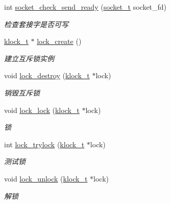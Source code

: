 \begin{DoxyCompactItemize}
int \hyperlink{a00100_a8afd26cc26824e35f1ec942d2c367c2b_a8afd26cc26824e35f1ec942d2c367c2b}{socket\+\_\+check\+\_\+send\+\_\+ready} (\hyperlink{a00066_a0d9e0afbf02fb6ed6c5b1415dce51b05_a0d9e0afbf02fb6ed6c5b1415dce51b05}{socket\+\_\+t} socket\+\_\+fd)
\begin{DoxyCompactList}\small\item\em 检查套接字是否可写 \end{DoxyCompactList}\item 
\hyperlink{a00066_a4c2f62ab63ab1fd49c71e52bbda0f393_a4c2f62ab63ab1fd49c71e52bbda0f393}{klock\+\_\+t} $\ast$ \hyperlink{a00100_a7860cb0060346d30b45ea9cb824c2be0_a7860cb0060346d30b45ea9cb824c2be0}{lock\+\_\+create} ()
\begin{DoxyCompactList}\small\item\em 建立互斥锁实例 \end{DoxyCompactList}\item 
void \hyperlink{a00100_aee8678800992b6012933740a9d7528af_aee8678800992b6012933740a9d7528af}{lock\+\_\+destroy} (\hyperlink{a00066_a4c2f62ab63ab1fd49c71e52bbda0f393_a4c2f62ab63ab1fd49c71e52bbda0f393}{klock\+\_\+t} $\ast$lock)
\begin{DoxyCompactList}\small\item\em 销毁互斥锁 \end{DoxyCompactList}\item 
void \hyperlink{a00100_a86243edfa22b75eec0d653c36ba238bf_a86243edfa22b75eec0d653c36ba238bf}{lock\+\_\+lock} (\hyperlink{a00066_a4c2f62ab63ab1fd49c71e52bbda0f393_a4c2f62ab63ab1fd49c71e52bbda0f393}{klock\+\_\+t} $\ast$lock)
\begin{DoxyCompactList}\small\item\em 锁 \end{DoxyCompactList}\item 
int \hyperlink{a00100_a878c20be611d9e051d0e9621546f15a2_a878c20be611d9e051d0e9621546f15a2}{lock\+\_\+trylock} (\hyperlink{a00066_a4c2f62ab63ab1fd49c71e52bbda0f393_a4c2f62ab63ab1fd49c71e52bbda0f393}{klock\+\_\+t} $\ast$lock)
\begin{DoxyCompactList}\small\item\em 测试锁 \end{DoxyCompactList}\item 
void \hyperlink{a00100_ae6d02ffedf7b881d70601d1ee73c3d72_ae6d02ffedf7b881d70601d1ee73c3d72}{lock\+\_\+unlock} (\hyperlink{a00066_a4c2f62ab63ab1fd49c71e52bbda0f393_a4c2f62ab63ab1fd49c71e52bbda0f393}{klock\+\_\+t} $\ast$lock)
\begin{DoxyCompactList}\small\item\em 解锁 \end{DoxyCompactList}\item 

\end{DoxyCompactItemize}
